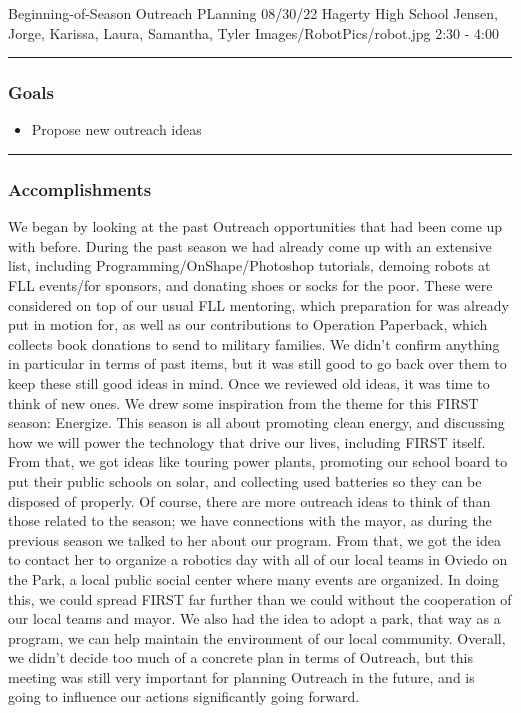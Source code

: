 \insertmeeting 
	{Beginning-of-Season Outreach PLanning} 
	{08/30/22}
	{Hagerty High School}
	{Jensen, Jorge, Karissa, Laura, Samantha, Tyler}
	{Images/RobotPics/robot.jpg}
	{2:30 - 4:00}
	
\noindent\hfil\rule{\textwidth}{.4pt}\hfil
\subsubsection*{Goals}
\begin{itemize}
    \item Propose new outreach ideas

\end{itemize} 

\noindent\hfil\rule{\textwidth}{.4pt}\hfil

\subsubsection*{Accomplishments}
We began by looking at the past Outreach opportunities that had been come up with before. During the past season we had already come up with an extensive list, including Programming/OnShape/Photoshop tutorials, demoing robots at FLL events/for sponsors, and donating shoes or socks for the poor. These were considered on top of our usual FLL mentoring, which preparation for was already put in motion for, as well as our contributions to Operation Paperback, which collects book donations to send to military families. We didn't confirm anything in particular in terms of past items, but it was still good to go back over them to keep these still good ideas in mind. 
Once we reviewed old ideas, it was time to think of new ones. We drew some inspiration from the theme for this FIRST season: Energize. This season is all about promoting clean energy, and discussing how we will power the technology that drive our lives, including FIRST itself. From that, we got ideas like touring power plants, promoting our school board to put their public schools on solar, and collecting used batteries so they can be disposed of properly.
Of course, there are more outreach ideas to think of than those related to the season; we have connections with the mayor, as during the previous season we talked to her about our program. From that, we got the idea to contact her to organize a robotics day with all of our local teams in Oviedo on the Park, a local public social center where many events are organized. In doing this, we could spread FIRST far further than we could without the cooperation of our local teams and mayor. We also had the idea to adopt a park, that way as a program, we can help maintain the environment of our local community.
Overall, we didn't decide too much of a concrete plan in terms of Outreach, but this meeting was still very important for planning Outreach in the future, and is going to influence our actions significantly going forward.


